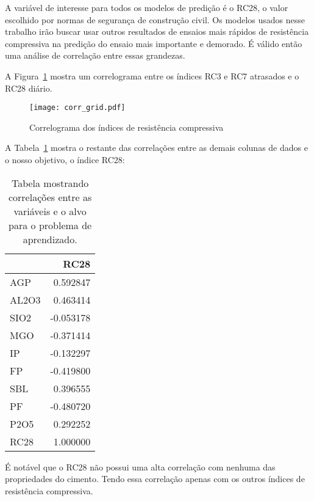 A variável de interesse para todos os modelos de predição é o RC28, o valor
escolhido por normas de segurança de construção civil. Os modelos usados nesse
trabalho irão buscar usar outros resultados de ensaios mais rápidos de
resistência compressiva na predição do ensaio mais importante e demorado. É
válido então uma análise de correlação entre essas grandezas.


A Figura~\ref{fig:gridcorr} mostra um correlograma entre os índices RC3 e RC7
atrasados e o RC28 diário. 

\begin{figure}[H]
  \centering
  \texttt{[image: corr\_grid.pdf]}
  \caption{Correlograma dos índices de resistência compressiva}
  \label{fig:gridcorr}
\end{figure}

A Tabela~\ref{tabelacorr} mostra o restante das correlações entre as demais
colunas de dados e o nosso objetivo, o índice RC28:


\begin{table}[H]
  \centering
\begin{tabular}{lr}
  \toprule
  {} &      RC28 \\
  \midrule
  AGP   &  0.592847 \\
  AL2O3 &  0.463414 \\
  SIO2  & -0.053178 \\
  MGO   & -0.371414 \\
  IP    & -0.132297 \\
  FP    & -0.419800 \\
  SBL   &  0.396555 \\
  PF    & -0.480720 \\
  P2O5  &  0.292252 \\
  RC28  &  1.000000 \\
  \bottomrule
\end{tabular}
\caption{Tabela mostrando correlações entre as variáveis e o alvo para o problema de aprendizado.}
\label{tabelacorr}
\end{table}


É notável que o RC28 não possui uma alta correlação com nenhuma das propriedades
do cimento. Tendo essa correlação apenas com os outros índices de resistência compressiva.




